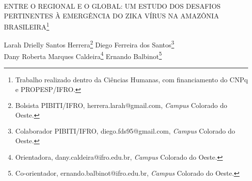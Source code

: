 \documentclass[article,12pt,onesidea,4paper,english,brazil]{abntex2}
\begin{document}
	
	
	\frenchspacing 
	
	\begin{center}
		\LARGE ENTRE O REGIONAL E O GLOBAL: UM ESTUDO DOS DESAFIOS
		PERTINENTES À EMERGÊNCIA DO ZIKA VÍRUS NA AMAZÔNIA BRASILEIRA\footnote{Trabalho realizado dentro da Ciências Humanas, com financiamento do CNPq e PROPESP/IFRO.}
		
		\normalsize
		Larah Drielly Santos Herrera\footnote{Bolsista PIBITI/IFRO, herrera.larah@gmail.com, \textit{Campus} Colorado do Oeste.} 
		Diego Ferreira dos Santos\footnote{Colaborador PIBITI/IFRO, diego.fds95@gmail.com, \textit{Campus} Colorado do Oeste.} \\
		Dany Roberta Marques Caldeira\footnote{Orientadora, dany.caldeira@ifro.edu.br, \textit{Campus} Colorado do Oeste.} 
		Ernando Balbinot\footnote{Co-orientador, ernando.balbinot@ifro.edu.br, \textit{Campus} Colorado do Oeste.} 
	\end{center}
	
\end{document}
